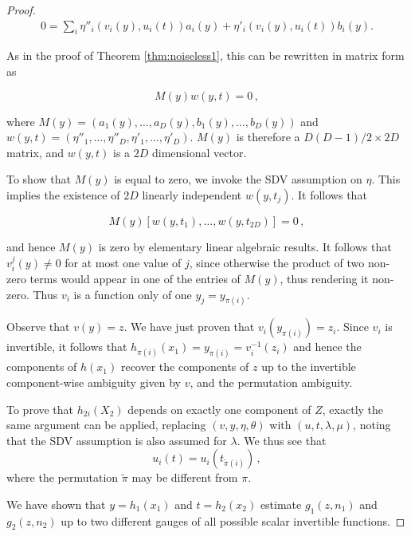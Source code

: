 \begin{proof}
	\begin{align*}
	0 = \sum_{i} \eta''_{i}(v_{i}({y}),u_{i}({t})){a}_i({y}) + \eta'_{i}(v_{i}({y}), u_{i}({t})){b}_i({y}).
	\end{align*}
	
	As in the proof of Theorem \ref{thm:noiseless1}, this can be rewritten in matrix form as
	
	\begin{equation}
	\label{eq:matrixmult}
	{M}({y}){w}({y}, {t})=0\,,
	\end{equation}
	
	where ${M}({y}) = ({a}_1({y}), \ldots,  {a}_D({y}), {b}_1({y}), \ldots, {b}_D({y})) $ and ${w}({y}, {t}) = (\eta''_{1}, \ldots, \eta''_{D}, \eta'_{1}, \ldots,\eta'_{D})$. ${M}({y})$ is therefore a $D(D-1)/2 \times 2D$ matrix, and ${w}({y}, {t})$ is a $2D$ dimensional vector.
	
	To show that ${M}({y})$ is equal to zero, we invoke the SDV assumption on ${\eta}$.
	This implies the existence of $2D$ linearly independent ${w}({y}, {t}_j)$.
	It follows that
	
	\[
	{M}({y})[{w}({y}, {t}_1), \ldots, {w}({y}, {t}_{2D})]=0\,,
	\]
	
	and hence ${M}({y})$ is zero by elementary linear algebraic results.
	It follows that $v_i^j({y})\not=0$ for at most one value of $j$, since otherwise the product of two non-zero terms would appear in one of the entries of ${M}({y})$, thus rendering it non-zero.
	Thus $v_i$ is a function only of one $y_j = y_{\pi(i)}$.
	
	Observe that ${v}({y}) = {z}$.
	We have just proven that $v_i(y_{\pi(i)}) = z_i$.
	Since $v_i$ is invertible, it follows that $h_{\pi(i)}({x}_{1}) = y_{\pi(i)} = v_i^{-1}(z_i)$ and hence the components of ${h}({x}_{1})$ recover the components of ${z}$ up to the invertible component-wise ambiguity given by ${v}$, and the permutation ambiguity.
	
To prove that $h_{2i}(X_2)$ depends on exactly one component of $Z$, exactly the same argument can be applied, replacing $({v},{y}, {\eta}, {\theta})$ with $({u},{t}, {\lambda}, {\mu})$, noting that the SDV assumption is also assumed for ${\lambda}$.
We thus see that 
	\begin{equation}
	\label{eq:u_onev}
	u_{i}({t})  = u_{i}(t_{\tilde{\pi}(i)})\,,
	\end{equation}
	where the permutation $\tilde{\pi}$ may be different from $\pi$.


We have shown that ${y}={h}_1({x}_1)$ and ${t}={h}_2({x}_2)$ estimate ${g}_1({z}, {n}_1)$ and ${g}_2({z}, {n}_2)$ up to two different gauges of all possible scalar invertible functions.
	

\end{proof}
